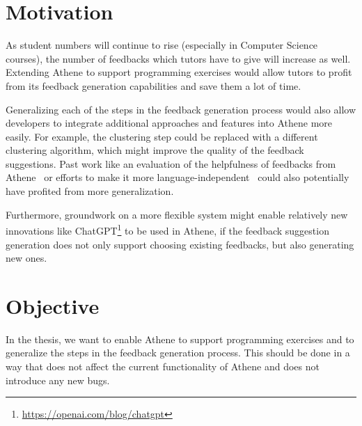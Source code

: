 \section*{Motivation}

As student numbers will continue to rise (especially in Computer Science courses), the number of feedbacks which tutors have to give will increase as well. Extending Athene to support programming exercises would allow tutors to profit from its feedback generation capabilities and save them a lot of time.

Generalizing each of the steps in the feedback generation process would also allow developers to integrate additional approaches and features into Athene more easily.
For example, the clustering step could be replaced with a different clustering algorithm, which might improve the quality of the feedback suggestions. Past work like an evaluation of the helpfulness of feedbacks from Athene~\cite{atheneTracking} or efforts to make it more language-independent~\cite{atheneLanguage} could also potentially have profited from more generalization.

Furthermore, groundwork on a more flexible system might enable relatively new innovations like ChatGPT\footnote{\url{https://openai.com/blog/chatgpt}} to be used in Athene, if the feedback suggestion generation does not only support choosing existing feedbacks, but also generating new ones.

\section*{Objective}
In the thesis, we want to enable Athene to support programming exercises and to generalize the steps in the feedback generation process. This should be done in a way that does not affect the current functionality of Athene and does not introduce any new bugs.


